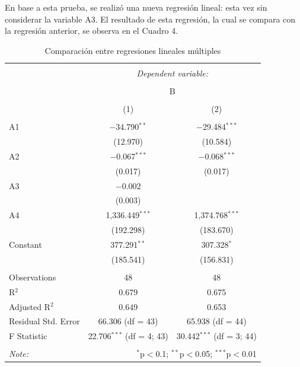 \documentclass[a4paper,10pt]{article}\usepackage[]{graphicx}\usepackage[]{color}
\begin{document}
En base a esta prueba, se realizó una nueva regresión lineal: esta vez sin considerar la variable A3. El resultado de esta regresión, la cual se compara con la regresión anterior, se observa en el Cuadro 4.


\begin{table}[!htbp] \centering 
  \caption{Comparación entre regresiones lineales múltiples} 
  \label{} 
\begin{tabular}{@{\extracolsep{5pt}}lcc} 
\\[-1.8ex]\hline 
\hline \\[-1.8ex] 
 & \multicolumn{2}{c}{\textit{Dependent variable:}} \\ 
\cline{2-3} 
\\[-1.8ex] & \multicolumn{2}{c}{B} \\ 
\\[-1.8ex] & (1) & (2)\\ 
\hline \\[-1.8ex] 
 A1 & $-$34.790$^{**}$ & $-$29.484$^{***}$ \\ 
  & (12.970) & (10.584) \\ 
  A2 & $-$0.067$^{***}$ & $-$0.068$^{***}$ \\ 
  & (0.017) & (0.017) \\ 
  A3 & $-$0.002 &  \\ 
  & (0.003) &  \\ 
  A4 & 1,336.449$^{***}$ & 1,374.768$^{***}$ \\ 
  & (192.298) & (183.670) \\ 
  Constant & 377.291$^{**}$ & 307.328$^{*}$ \\ 
  & (185.541) & (156.831) \\ 
 \hline \\[-1.8ex] 
Observations & 48 & 48 \\ 
R$^{2}$ & 0.679 & 0.675 \\ 
Adjusted R$^{2}$ & 0.649 & 0.653 \\ 
Residual Std. Error & 66.306 (df = 43) & 65.938 (df = 44) \\ 
F Statistic & 22.706$^{***}$ (df = 4; 43) & 30.442$^{***}$ (df = 3; 44) \\ 
\hline 
\hline \\[-1.8ex] 
\textit{Note:}  & \multicolumn{2}{r}{$^{*}$p$<$0.1; $^{**}$p$<$0.05; $^{***}$p$<$0.01} \\ 
\end{tabular} 
\end{table} 
\end{document}

